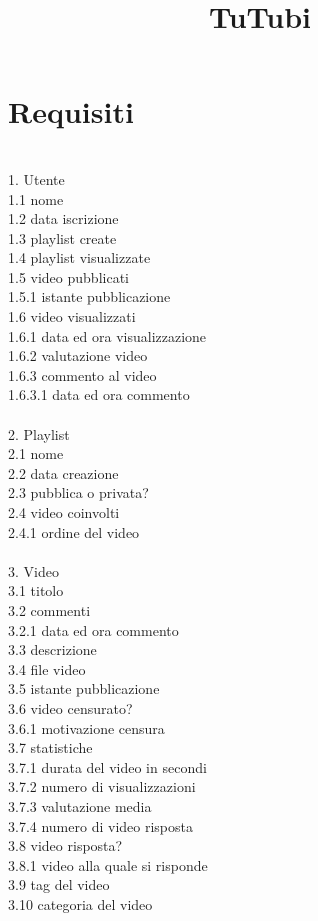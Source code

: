 \documentclass[12pt, letterpaper]{article}
\title{\textbf{TuTubi}}
\date{}
\newcommand{\acc}{\\\hphantom{}\\}
\newcommand{\id}{{\hphantom{ident}}}
\begin{document}
\maketitle\section{Requisiti}
\hphantom{a}\\
1. Utente \\
\id 1.1 nome \\
\id 1.2 data iscrizione \\
\id 1.3 playlist create \\
\id 1.4 playlist visualizzate \\
\id 1.5 video pubblicati\\
\id \id 1.5.1 istante pubblicazione\\
\id 1.6 video visualizzati \\
\id \id 1.6.1 data ed ora visualizzazione \\
\id \id 1.6.2 valutazione video \\
\id \id 1.6.3 commento al video\\
\id \id \id 1.6.3.1 data ed ora commento \acc
2. Playlist \\
\id 2.1 nome \\
\id 2.2 data creazione \\
\id 2.3 pubblica o privata? \\
\id 2.4 video coinvolti \\
\id \id 2.4.1 ordine del video \acc
3. Video \\
\id 3.1 titolo \\
\id 3.2 commenti \\
\id \id 3.2.1 data ed ora commento \\
\id 3.3 descrizione \\
\id 3.4 file video \\
\id 3.5 istante pubblicazione \\
\id 3.6 video censurato? \\
\id \id 3.6.1 motivazione censura\\
\id 3.7 statistiche \\
\id \id 3.7.1 durata del video in secondi \\
\id \id 3.7.2 numero di visualizzazioni \\
\id \id 3.7.3 valutazione media \\
\id \id 3.7.4 numero di video risposta\\
\id 3.8 video risposta? \\
\id \id 3.8.1 video alla quale si risponde \\
\id 3.9 tag del video \\
\id 3.10 categoria del video\\
\end{document}
